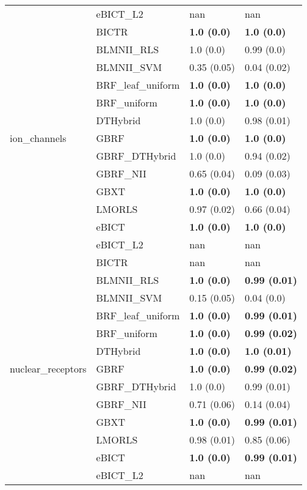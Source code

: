 \begin{tabular}{llll}
 & eBICT\_L2 & nan & nan \\
\cline{1-2}
\multirow[c]{13}{*}{ion\_channels} & BICTR & \textbf{1.0 (0.0)} & \textbf{1.0 (0.0)} \\
 & BLMNII\_RLS & 1.0 (0.0) & 0.99 (0.0) \\
 & BLMNII\_SVM & 0.35 (0.05) & 0.04 (0.02) \\
 & BRF\_leaf\_uniform & \textbf{1.0 (0.0)} & \textbf{1.0 (0.0)} \\
 & BRF\_uniform & \textbf{1.0 (0.0)} & \textbf{1.0 (0.0)} \\
 & DTHybrid & 1.0 (0.0) & 0.98 (0.01) \\
 & GBRF & \textbf{1.0 (0.0)} & \textbf{1.0 (0.0)} \\
 & GBRF\_DTHybrid & 1.0 (0.0) & 0.94 (0.02) \\
 & GBRF\_NII & 0.65 (0.04) & 0.09 (0.03) \\
 & GBXT & \textbf{1.0 (0.0)} & \textbf{1.0 (0.0)} \\
 & LMORLS & 0.97 (0.02) & 0.66 (0.04) \\
 & eBICT & \textbf{1.0 (0.0)} & \textbf{1.0 (0.0)} \\
 & eBICT\_L2 & nan & nan \\
\cline{1-2}
\multirow[c]{13}{*}{nuclear\_receptors} & BICTR & nan & nan \\
 & BLMNII\_RLS & \textbf{1.0 (0.0)} & \textbf{0.99 (0.01)} \\
 & BLMNII\_SVM & 0.15 (0.05) & 0.04 (0.0) \\
 & BRF\_leaf\_uniform & \textbf{1.0 (0.0)} & \textbf{0.99 (0.01)} \\
 & BRF\_uniform & \textbf{1.0 (0.0)} & \textbf{0.99 (0.02)} \\
 & DTHybrid & \textbf{1.0 (0.0)} & \textbf{1.0 (0.01)} \\
 & GBRF & \textbf{1.0 (0.0)} & \textbf{0.99 (0.02)} \\
 & GBRF\_DTHybrid & 1.0 (0.0) & 0.99 (0.01) \\
 & GBRF\_NII & 0.71 (0.06) & 0.14 (0.04) \\
 & GBXT & \textbf{1.0 (0.0)} & \textbf{0.99 (0.01)} \\
 & LMORLS & 0.98 (0.01) & 0.85 (0.06) \\
 & eBICT & \textbf{1.0 (0.0)} & \textbf{0.99 (0.01)} \\
 & eBICT\_L2 & nan & nan \\
\cline{1-2}
\bottomrule
\end{tabular}
